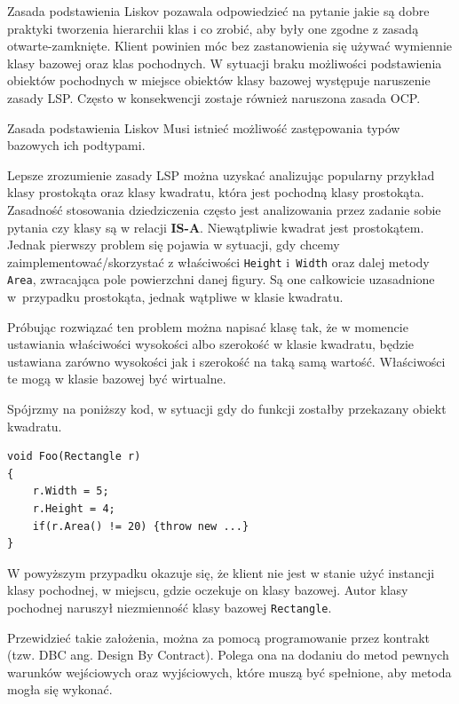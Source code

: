 Zasada podstawienia Liskov pozawala odpowiedzieć na pytanie jakie są dobre praktyki tworzenia hierarchii klas i co zrobić, aby były one zgodne z zasadą otwarte-zamknięte. Klient powinien móc bez zastanowienia się używać wymiennie klasy bazowej oraz klas pochodnych. W sytuacji braku możliwości podstawienia obiektów pochodnych w miejsce obiektów klasy bazowej występuje naruszenie zasady LSP. Często w konsekwencji zostaje również naruszona zasada OCP.

\begin{myboxWithTitle}{Zasada podstawienia Liskov}
Musi istnieć możliwość zastępowania typów bazowych ich podtypami.
\end{myboxWithTitle}

Lepsze zrozumienie zasady LSP można uzyskać analizując popularny przykład klasy prostokąta oraz klasy kwadratu, która jest pochodną klasy prostokąta. Zasadność stosowania dziedziczenia często jest analizowania przez zadanie sobie pytania czy klasy są w relacji \textbf{IS-A}. Niewątpliwie kwadrat jest prostokątem. Jednak pierwszy problem się pojawia w sytuacji, gdy chcemy zaimplementować/skorzystać z właściwości \texttt{Height} i~\texttt{Width} oraz dalej metody \texttt{Area}, zwracająca pole powierzchni danej figury. Są one całkowicie uzasadnione w~przypadku prostokąta, jednak wątpliwe w klasie kwadratu. 

Próbując rozwiązać ten problem można napisać klasę tak, że w momencie ustawiania właściwości wysokości albo szerokość w klasie kwadratu, będzie ustawiana zarówno wysokości jak i szerokość na taką samą wartość. Właściwości te mogą w klasie bazowej być wirtualne. 

Spójrzmy na poniższy kod, w sytuacji gdy do funkcji zostałby przekazany obiekt kwadratu.
\begin{lstlisting}[caption={Naruszenie zasady LSP}, label={lab1/lst/lspViolationSquareRectangle}]
void Foo(Rectangle r)
{
	r.Width = 5;
	r.Height = 4;
	if(r.Area() != 20) {throw new ...}
}
\end{lstlisting}

W powyższym przypadku okazuje się, że klient nie jest w stanie użyć instancji klasy pochodnej, w miejscu, gdzie oczekuje on klasy bazowej. Autor klasy pochodnej naruszył niezmienność klasy bazowej \texttt{Rectangle}.


Przewidzieć takie założenia, można za pomocą  programowanie przez kontrakt (tzw. DBC ang. Design By Contract). Polega ona na dodaniu do metod pewnych warunków wejściowych oraz wyjściowych, które muszą być spełnione, aby metoda mogła się wykonać. 

